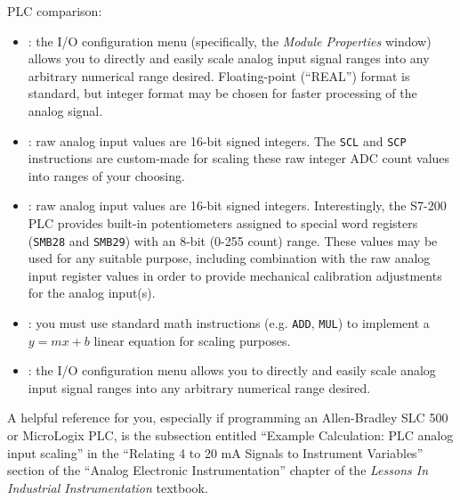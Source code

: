 \vfil 

\noindent
PLC comparison:

\begin{itemize}
\item{} : the I/O configuration menu (specifically, the {\it Module Properties} window) allows you to directly and easily scale analog input signal ranges into any arbitrary numerical range desired.  Floating-point (``REAL'') format is standard, but integer format may be chosen for faster processing of the analog signal.
\vskip 5pt
\item{} : raw analog input values are 16-bit signed integers.  The {\tt SCL} and {\tt SCP} instructions are custom-made for scaling these raw integer ADC count values into ranges of your choosing.
\vskip 5pt
\item{} : raw analog input values are 16-bit signed integers.  Interestingly, the S7-200 PLC provides built-in potentiometers assigned to special word registers ({\tt SMB28} and {\tt SMB29}) with an 8-bit (0-255 count) range.  These values may be used for any suitable purpose, including combination with the raw analog input register values in order to provide mechanical calibration adjustments for the analog input(s).
\vskip 5pt
\item{} : you must use standard math instructions (e.g. {\tt ADD}, {\tt MUL}) to implement a $y = mx + b$ linear equation for scaling purposes.
\vskip 5pt
\item{} : the I/O configuration menu allows you to directly and easily scale analog input signal ranges into any arbitrary numerical range desired.
\end{itemize}

\eject






A helpful reference for you, especially if programming an Allen-Bradley SLC 500 or MicroLogix PLC, is the subsection entitled ``Example Calculation: PLC analog input scaling'' in the ``Relating 4 to 20 mA Signals to Instrument Variables'' section of the ``Analog Electronic Instrumentation'' chapter of the {\it Lessons In Industrial Instrumentation} textbook.











